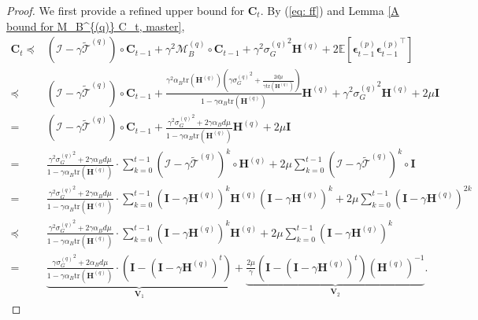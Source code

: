 \documentclass[11pt, letterpaper]{article}
\begin{document}
\begin{proof}
    We first provide a refined upper bound for $\mathbf{C}_t$. By (\ref{eq: ff}) and Lemma \ref{A bound for M_B^{(q)} C_t, master},
    \begin{equation*}
        \begin{aligned}
            \mathbf{C}_t \preceq &(\mathcal{I}-\gamma\widetilde{\mathcal{T}}^{(q)})\circ \mathbf{C}_{t-1}+\gamma^2\mathcal{M}_B^{(q)}\circ \mathbf{C}_{t-1}+\gamma^2{\sigma_G^{(q)}}^2\mathbf{H}^{(q)}+2\mathbb{E}\left[\boldsymbol{\epsilon}_{t-1}^{(p)}{\boldsymbol{\epsilon}_{t-1}^{(p)}}^\top\right]\\
            \preceq & (\mathcal{I}-\gamma\widetilde{\mathcal{T}}^{(q)})\circ \mathbf{C}_{t-1} + \frac{\gamma^2\alpha_B\mathrm{tr}(\mathbf{H}^{(q)})\left(\gamma{\sigma_G^{(q)}}^2+\frac{2d\mu}{\gamma\mathrm{tr}(\mathbf{H}^{(q)})}\right)}{1-\gamma\alpha_B\mathrm{tr}(\mathbf{H}^{(q)})} \mathbf{H}^{(q)}+\gamma^2{\sigma_G^{(q)}}^2\mathbf{H}^{(q)}+2\mu\mathbf{I}\\
            =& (\mathcal{I}-\gamma\widetilde{\mathcal{T}}^{(q)})\circ \mathbf{C}_{t-1} + \frac{\gamma^2{\sigma_G^{(q)}}^2+2\gamma\alpha_Bd\mu}{1-\gamma\alpha_B\mathrm{tr}(\mathbf{H}^{(q)})} \mathbf{H}^{(q)}+2\mu\mathbf{I}\\
            =&\frac{\gamma^2{\sigma_G^{(q)}}^2+2\gamma\alpha_Bd\mu}{1-\gamma\alpha_B\mathrm{tr}(\mathbf{H}^{(q)})}\cdot\sum_{k=0}^{t-1}(\mathcal{I}-\gamma\widetilde{\mathcal{T}}^{(q)})^k\circ\mathbf{H}^{(q)}+2\mu\sum_{k=0}^{t-1}(\mathcal{I}-\gamma\widetilde{\mathcal{T}}^{(q)})^k\circ\mathbf{I}\\
            =&\frac{\gamma^2{\sigma_G^{(q)}}^2+2\gamma\alpha_Bd\mu}{1-\gamma\alpha_B\mathrm{tr}(\mathbf{H}^{(q)})}\cdot\sum_{k=0}^{t-1}(\mathbf{I}-\gamma \mathbf{H}^{(q)})^k\mathbf{H}^{(q)}(\mathbf{I}-\gamma \mathbf{H}^{(q)})^k+2\mu\sum_{k=0}^{t-1}(\mathbf{I}-\gamma \mathbf{H}^{(q)})^{2k} \\
            \preceq&\frac{\gamma^2{\sigma_G^{(q)}}^2+2\gamma\alpha_Bd\mu}{1-\gamma\alpha_B\mathrm{tr}(\mathbf{H}^{(q)})}\cdot\sum_{k=0}^{t-1}(\mathbf{I}-\gamma \mathbf{H}^{(q)})^k\mathbf{H}^{(q)}+2\mu\sum_{k=0}^{t-1}(\mathbf{I}-\gamma \mathbf{H}^{(q)})^{k} \\
            =&\underbrace{\frac{\gamma{\sigma_G^{(q)}}^2+2\alpha_Bd\mu}{1-\gamma\alpha_B\mathrm{tr}(\mathbf{H}^{(q)})}\cdot\left(\mathbf{I}-(\mathbf{I}-\gamma\mathbf{H}^{(q)})^t\right)}_{\mathbf{V}_1}+\underbrace{\frac{2\mu}{\gamma}\left(\mathbf{I}-(\mathbf{I}-\gamma\mathbf{H}^{(q)})^t\right)(\mathbf{H}^{(q)})^{-1}}_{\mathbf{V}_2}.

\end{aligned}
\end{equation*}
\end{proof}
\end{document}
